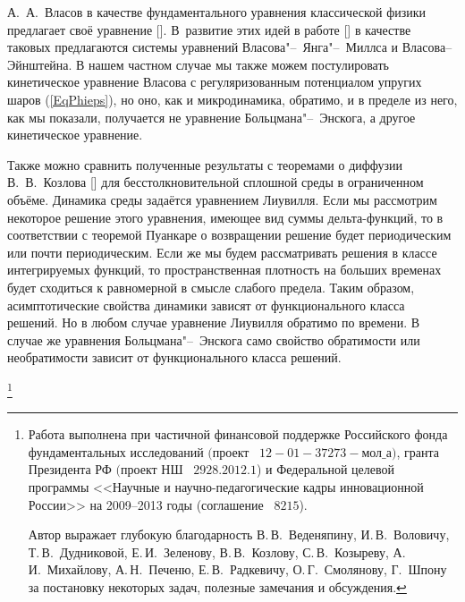 А.~А.~Власов в качестве фундаментального уравнения классической физики предлагает своё уравнение []. В~развитие этих идей в работе [] в качестве таковых предлагаются системы уравнений Власова"--~Янга"--~Миллса и Власова--Эйнштейна. В нашем частном случае мы также можем постулировать кинетическое уравнение Власова с регуляризованным потенциалом упругих шаров (\ref{EqPhieps}), но оно, как и микродинамика, обратимо, и в пределе из него, как мы показали,  получается не уравнение Больцмана"--~Энскога, а другое кинетическое уравнение.

Также можно сравнить полученные результаты с теоремами о диффузии В.~В.~Козлова [] для бесстолкновительной сплошной среды в ограниченном объёме. Динамика среды задаётся уравнением Лиувилля. Если мы рассмотрим некоторое решение этого уравнения, имеющее вид суммы дельта-функций, то в соответствии с теоремой Пуанкаре о возвращении решение будет периодическим или почти периодическим. Если же мы будем рассматривать решения в классе интегрируемых функций, то пространственная плотность на больших временах будет сходиться к равномерной в смысле слабого предела. Таким образом, асимптотические свойства динамики зависят от функционального класса решений. Но в любом случае уравнение Лиувилля обратимо по времени. В  случае же уравнения Больцмана"--~Энскога само свойство обратимости или необратимости  зависит от функционального класса решений.



{\thanks{Работа выполнена при частичной финансовой поддержке Российского
фонда фундаментальных исследований $($проект \rm \No~$12{-}01{-}37273{-}\text{мол\_а})$, гранта Президента РФ $($проект НШ \rm \No~$2928.2012.1$) и Федеральной целевой программы <<Научные и
научно-педагогические кадры инновационной России>> на 2009--2013 годы
(соглашение \rm \No~$8215$).

Автор выражает глубокую благодарность В.\,В.~Веденяпину, И.\,В.~Воловичу, Т.\,В.~Дудниковой, Е.\,И.~Зеленову, 
В.\,В.~Козлову, С.\,В.~Козыреву, А.\,И.~Михайлову, А.\,Н.~Печеню, Е.\,В.~Радкевичу, О.\,Г.~Смолянову, Г.~Шпону
за постановку некоторых задач, полезные замечания и обсуждения.
}}



